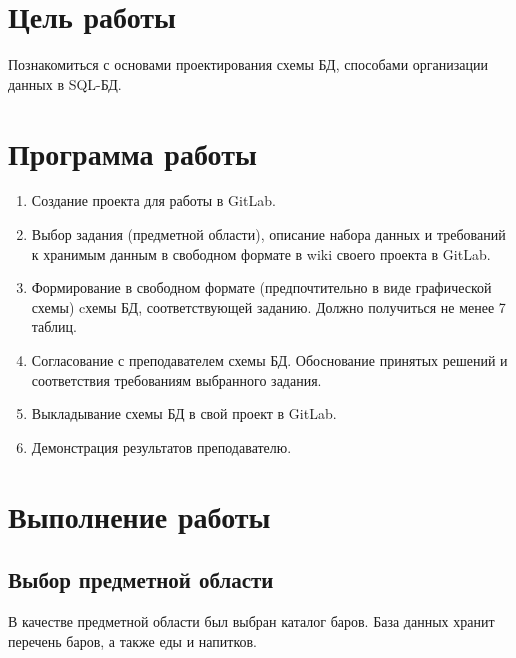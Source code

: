 
\usepackage{minted}







\section{Цель работы}
Познакомиться с основами проектирования схемы БД, способами организации данных в SQL-БД.

\section{Программа работы}
	\begin {enumerate}
	\item Создание проекта для работы в GitLab.
	\item Выбор задания (предметной области), описание набора данных и требований к хранимым данным в свободном формате в wiki своего проекта в GitLab.
	\item Формирование в свободном формате (предпочтительно в виде графической схемы) cхемы БД, соответствующей заданию. Должно получиться не менее 7 таблиц.
	\item Согласование с преподавателем схемы БД. Обоснование принятых решений и соответствия требованиям выбранного задания. 
	\item Выкладывание схемы БД в свой проект в GitLab.
	\item Демонстрация результатов преподавателю.
	\end {enumerate}

\section{Выполнение работы}


\subsection{Выбор предметной области}

В качестве предметной области был выбран каталог баров. База данных хранит перечень баров, а также еды и напитков.

